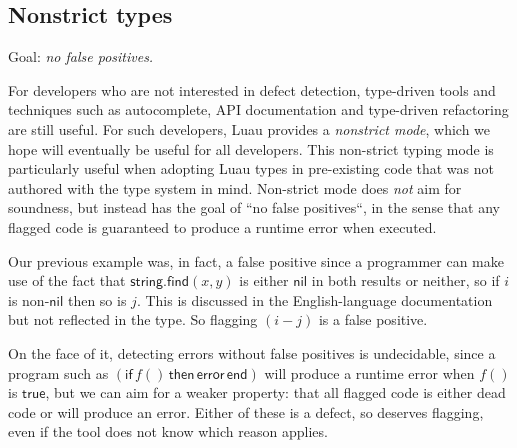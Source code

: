 \documentclass[acmsmall]{acmart}
\newcommand{\NIL}{\mathsf{nil}}
\newcommand{\TRUE}{\mathsf{true}}
\newcommand{\STRING}{\mathsf{string}}
\newcommand{\ERROR}{\mathsf{error}}
\newcommand{\IF}{\mathsf{if}\,}
\newcommand{\THEN}{\,\mathsf{then}\,}
\newcommand{\END}{\,\mathsf{end}}
\newcommand{\FIND}{\mathsf{find}}
\begin{document}
\subsection{Nonstrict types}

Goal: \emph{no false positives.}

For developers who are not interested in defect detection, type-driven
tools and techniques such as autocomplete, API documentation
and type-driven refactoring are still useful.
For such developers, Luau provides a
\emph{nonstrict mode}, which we hope will eventually be useful for all
developers.  This non-strict typing mode is particularly useful when
adopting Luau types in pre-existing code that was not authored with
the type system in mind.  Non-strict mode does \emph{not} aim for
soundness, but instead has the goal of ``no false positives``, in the
sense that any flagged code is guaranteed to produce a runtime error
when executed.

Our previous example was, in fact, a false positive since a programmer
can make use of the fact that $\STRING.\FIND(x, y)$ is either $\NIL$
in both results or neither, so if $i$ is non-$\NIL$ then so is $j$.
This is discussed in the English-language documentation but not reflected
in the type. So flagging $(i - j)$ is a false positive.

On the face of it, detecting errors without false positives is undecidable, since a program such as
$(\IF f() \THEN \ERROR \END)$ will produce a runtime error when $f()$ is
$\TRUE$, but we can aim for a weaker property: that all flagged code
is either dead code or will produce an error. Either of these is a
defect, so deserves flagging, even if the tool does not know
which reason applies.
\end{document}
